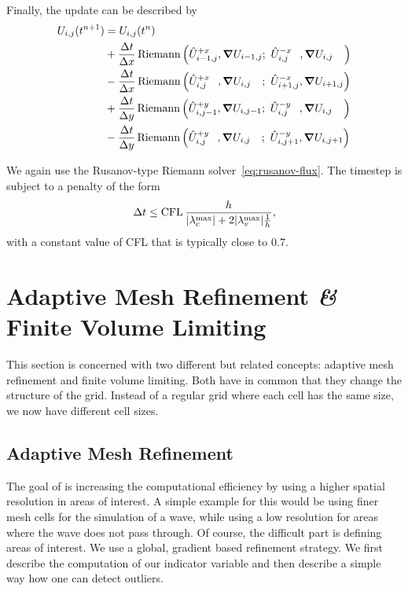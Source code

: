 Finally, the update can be described by
\begin{align}
  \begin{split}
    \cellAvg (t^{n+1}) &= \cellAvg (t^n)
    \\ &+
  \frac{\Delta t}{\Delta x}
    \Riemann \left(
      \evolvedCellAvg[i-1,j]{+x}, \gradCellAvg[i-1,j]; \ %
      \evolvedCellAvg[i,j\phantom{-1}]{-x}, \gradCellAvg[i,j\phantom{-1}]
    \right)
    \\ &-
  \frac{\Delta t}{\Delta x}
    \Riemann \left(
      \evolvedCellAvg[i,j\phantom{+1}]{+x}, \gradCellAvg[i,j\phantom{+1}]; \ %
      \evolvedCellAvg[i+1,j]{-x}, \gradCellAvg[i+1,j]
    \right)
    \\ &+
  \frac{\Delta t}{\Delta y}
    \Riemann \left(
      \evolvedCellAvg[i,j-1]{+y}, \gradCellAvg[i,j-1]; \ %
      \evolvedCellAvg[i,j\phantom{-1}]{-y}, \gradCellAvg[i,j\phantom{-1}]
    \right)
    \\ &-
  \frac{\Delta t}{\Delta y}
    \Riemann \left(
      \evolvedCellAvg[i,j\phantom{+1}]{+y}, \gradCellAvg[i,j\phantom{+1}]; \ %
      \evolvedCellAvg[i,j+1]{-y}, \gradCellAvg[i,j+1]
    \right)    
  \end{split}
\end{align}

We again use the Rusanov-type Riemann solver~\cref{eq:rusanov-flux}.
The timestep is subject to a penalty of the form
\begin{equation}\label{eq:cfl-muscl}
 \Delta t \leq  \text{CFL} \, \frac{h}{\maxConvEigen + 2 \maxViscEigen \frac{1}{h}},
\end{equation}
with a constant value of CFL that is typically close to $0.7$.

\section{Adaptive Mesh Refinement \textit{\&} Finite Volume Limiting}\label{sec:grid}
This section is concerned with two different but related concepts:%
adaptive mesh refinement \amr{} and finite volume limiting.
Both have in common that they change the structure of the grid.
Instead of a regular grid where each cell has the same size, we now have different cell sizes.

\subsection{Adaptive Mesh Refinement}\label{sec:amr}
The goal of \amr{} is increasing the computational efficiency by using a higher spatial resolution in areas of interest.
A simple example for this would be using finer mesh cells for the simulation of a wave, while using a low resolution for areas where the wave does not pass through.
Of course, the difficult part is defining areas of interest.
We use a global, gradient based refinement strategy.
We first describe the computation of our indicator variable and then describe a simple way how one can detect outliers.


